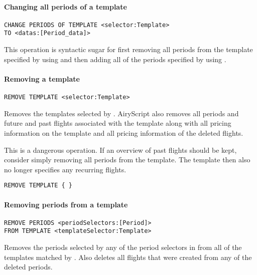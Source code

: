 \paragraph{Changing all periods of a template}
\begin{operation}
  \label{op:change_periods}
  \begin{lstlisting}
CHANGE PERIODS OF TEMPLATE <selector:Template>
TO <datas:[Period_data]>
  \end{lstlisting}
\end{operation}
This operation is syntactic sugar for first removing all periods from the
template specified by  using  and then
adding all of the periods specified by  using
.

\paragraph{Removing a template}
\begin{operation}
  \lstinline{REMOVE TEMPLATE <selector:Template>}
\end{operation}
Removes the templates selected by . AiryScript also removes all
periods and future and past flights associated with the template along with all
pricing information on the template and all pricing information of the deleted
flights.

This is a dangerous operation. If an overview of past flights should be kept,
consider simply removing all periods from the template. The template then also
no longer specifies any recurring flights.

\begin{texa}
  \begin{lstlisting}
REMOVE TEMPLATE { }
  \end{lstlisting}
\end{texa}

\paragraph{Removing periods from a template}
\begin{operation}
  \label{op:remove_periods}
  \begin{lstlisting}
REMOVE PERIODS <periodSelectors:[Period]>
FROM TEMPLATE <templateSelector:Template>
  \end{lstlisting}
\end{operation}
Removes the periods selected by any of the period selectors in
 from all of the templates matched by
. Also deletes all flights that were created from any of
the deleted periods.


